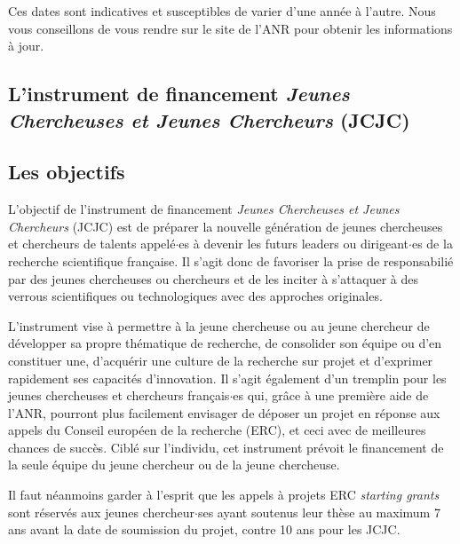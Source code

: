 Ces dates sont indicatives et susceptibles de varier d'une ann\'ee \`a l'autre. Nous vous conseillons de vous rendre sur le site de l'ANR pour obtenir les informations \`a jour.



\subsection{L'instrument de financement {\em Jeunes Chercheuses et Jeunes Chercheurs} (JCJC)}




\subsection*{Les objectifs}

L'objectif de l'instrument de financement {\em Jeunes Chercheuses et Jeunes Chercheurs} (JCJC) est de pr\'eparer la nouvelle g\'en\'eration de jeunes chercheuses et chercheurs de talents appel\'e$\cdot$es \`a devenir les futurs leaders ou dirigeant$\cdot$es de la recherche scientifique fran\c{c}aise. Il s'agit donc de favoriser la prise de responsabili\'e par des jeunes chercheuses ou chercheurs et de les inciter \`a s'attaquer \`a des verrous scientifiques ou technologiques avec des approches originales.

L'instrument vise \`a permettre \`a la jeune chercheuse ou au jeune chercheur de d\'evelopper sa propre th\'ematique de recherche, de consolider son
\'equipe ou d'en constituer une, d'acqu\'erir
une culture de la recherche sur projet et d'exprimer rapidement ses capacit\'es d'innovation. Il s'agit \'egalement d'un tremplin pour les jeunes chercheuses et
chercheurs fran\c{c}ais$\cdot$es qui, gr\^ace \`a une premi\`ere aide de l'ANR, pourront plus facilement envisager de d\'eposer un projet en r\'eponse aux appels du Conseil europ\'een  de la recherche (ERC), et ceci avec de meilleures chances de succ\`es.
Cibl\'e sur l'individu, cet instrument pr\'evoit le financement de la
seule \'equipe du jeune chercheur ou de la jeune chercheuse.

Il faut n\'eanmoins garder \`a l'esprit que les appels \`a projets ERC \emph{starting grants} sont r\'eserv\'es aux jeunes chercheur$\cdot$ses ayant soutenus leur th\`ese au maximum 7 ans avant la date de soumission du projet, contre 10 ans pour les JCJC.

